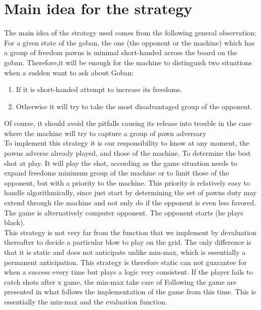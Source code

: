 \documentclass{report}
\begin{document}
\section {Main idea for the strategy}

The main idea of the strategy used comes from  the following general observation:
For a given state of the goban, the one (the opponent or the machine) which has a group of
freedom pawns is minimal short-handed across the board on the goban. Therefore,it will be
enough for the machine to distinguish two situations when a sudden want to ask about
Goban:\\
\begin{enumerate}
\item If it is short-handed attempt to increase its freedoms.
\item Otherwise it will try to take the most disadvantaged group of the opponent.
\end{enumerate}
Of course, it should avoid the pitfalls causing its release into trouble in the case
where the machine will try to capture a group of pawn adversary\\

To implement this strategy it is our responsibility to know at any moment, the pawns
adverse already played, and those of the machine. To determine the best shot at
play. It will play the shot, according as the game situation needs to expand freedoms
minimum group of the machine or to limit those of the opponent, but with a
priority to the machine. This priority is relatively easy to handle algorithmically, since just start by determining the set of pawns
duty may extend through the machine and not only do if the opponent
is even less favored.
The game is alternatively computer opponent. The opponent starts (he plays
black).\\

This strategy is not very far from the function that we implement by devaluation
thereafter to decide a particular blow to play on the grid. The only difference is that
it is static and does not anticipate unlike min-max, which is essentially a
permanent anticipation. This strategy is therefore static can not guarantee for
when a success every time but plays a logic very consistent.
If the player fails to catch shots after x game, the min-max take care of
Following the game are presented in what follows the implementation of the game from this
time. This is essentially the min-max and the evaluation function.\\
\end{document}
